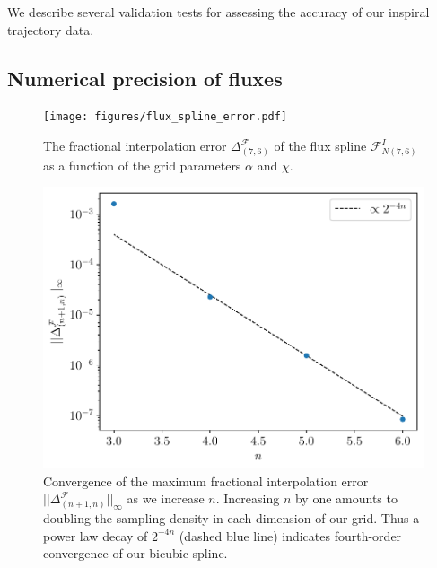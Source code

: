 \documentclass[%
 reprint,
 nofootinbib,
 amsmath,amssymb,
 aps,
 prd,
]{revtex4-2}
\begin{document}
We describe several validation tests for assessing the accuracy of our inspiral trajectory data.

\subsection{Numerical precision of fluxes}
\label{app:fluxtests}

\begin{figure}[!tp]
    \centering
    \texttt{[image: figures/flux\_spline\_error.pdf]}
    \caption{The fractional interpolation error $\Delta^\mathcal{F}_{(7,6)}$ of the flux spline $\mathcal{F}_{N(7,6)}^I$ as a function of the grid parameters $\alpha$ and $\chi$.}
    \label{fig:fluxSplineError}
\end{figure}

\begin{figure}[!t]
    \centering
    \includegraphics[width=0.95\linewidth]{figures/spline_convergence.pdf}
    \caption{Convergence of the maximum fractional interpolation error $||\Delta^\mathcal{F}_{(n+1,n)}||_\infty$ as we increase $n$. Increasing $n$ by one amounts to  doubling the sampling density in each dimension of our grid. Thus a power law decay of $2^{-4n}$ (dashed blue line) indicates fourth-order convergence of our bicubic spline.}
    \label{fig:fluxSplineConvergence}
\end{figure}
\end{document}
